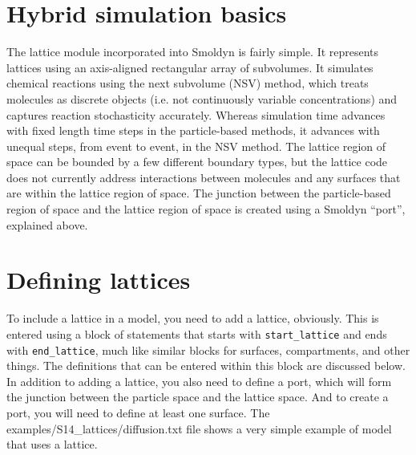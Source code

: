 \documentclass {scrbook}
\newcommand {\ttt} {\texttt}
\begin{document}
\section{Hybrid simulation basics}

The lattice module incorporated into Smoldyn is fairly simple. It represents lattices using an axis-aligned rectangular array of subvolumes. It simulates chemical reactions using the next subvolume (NSV) method, which treats molecules as discrete objects (i.e. not continuously variable concentrations) and captures reaction stochasticity accurately. Whereas simulation time advances with fixed length time steps in the particle-based methods, it advances with unequal steps, from event to event, in the NSV method. The lattice region of space can be bounded by a few different boundary types, but the lattice code does not currently address interactions between molecules and any surfaces that are within the lattice region of space. The junction between the particle-based region of space and the lattice region of space is created using a Smoldyn ``port'', explained above.

\section{Defining lattices}

To include a lattice in a model, you need to add a lattice, obviously. This is entered using a block of statements that starts with \ttt{start\_lattice} and ends with \ttt{end\_lattice}, much like similar blocks for surfaces, compartments, and other things. The definitions that can be entered within this block are discussed below. In addition to adding a lattice, you also need to define a port, which will form the junction between the particle space and the lattice space. And to create a port, you will need to define at least one surface. The examples/S14\_lattices/diffusion.txt file shows a very simple example of model that uses a lattice.
\end{document}
